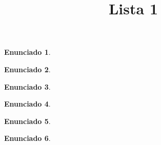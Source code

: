 \documentclass{article}
\title{Lista 1}
\date{\displaydate{fecha}}
\theoremstyle{definition}
\newtheorem{enunciado}{Enunciado}
\newenvironment{ejercicio}{\begin{enunciado}}{\end{enunciado}}
\newenvironment{solucion}{\begin{proof}[Solución]}{\end{proof}}
\begin{document}
	\maketitle

	\begin{ejercicio}\end{ejercicio}

	\begin{ejercicio}\end{ejercicio}

	\begin{ejercicio}\end{ejercicio}

	\begin{ejercicio}\end{ejercicio}

	\begin{ejercicio}\end{ejercicio}

	\begin{ejercicio}\end{ejercicio}
\end{document}
